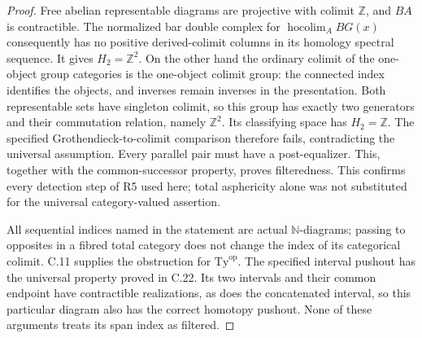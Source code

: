 \begin{proof}
Free abelian representable diagrams are projective with colimit
$\mathbb Z$, and $BA$ is contractible. The normalized bar
double complex for $\operatorname{hocolim}_A BG(x)$ consequently
has no positive derived-colimit columns in its homology spectral
sequence. It gives $H_2=\mathbb Z^2$. On the other hand the
ordinary colimit of the one-object group categories is the
one-object colimit group: the connected index identifies the
objects, and inverses remain inverses in the presentation.
Both representable sets have singleton colimit, so this group
has exactly two generators and their commutation relation,
namely $\mathbb Z^2$. Its classifying space has $H_2=\mathbb Z$.
The specified Grothendieck-to-colimit comparison therefore fails,
contradicting the universal assumption. Every parallel pair must
have a post-equalizer. This, together with the common-successor
property, proves filteredness. This confirms every detection step
of R5 used here; total asphericity alone was not substituted for
the universal category-valued assertion.

All sequential indices named in the statement are actual
$\mathbb N$-diagrams; passing to opposites in a fibred total
category does not change the index of its categorical colimit.
C.11 supplies the obstruction for $\mathrm{Ty}^{\mathrm{op}}$.
The specified interval pushout has the universal property proved
in C.22. Its two intervals and their common endpoint have
contractible realizations, as does the concatenated interval, so
this particular diagram also has the correct homotopy pushout.
None of these arguments treats its span index as filtered.
\end{proof}

